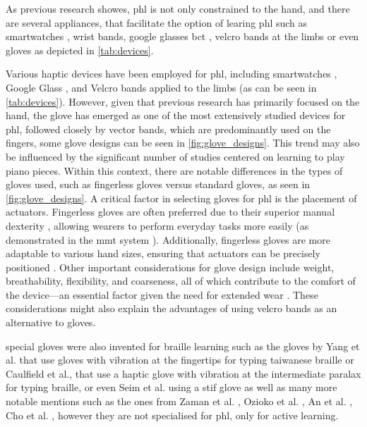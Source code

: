As previous research showes, \gls{phl} is not only constrained to the hand, and there are several appliances, that facilitate the option of learing \gls{phl} such as smartwatches \cite{Seim2018}, wrist bands, google glasses \gls{bct} \cite{Seim2016a}, velcro bands at the limbs \cite{Bouwer2011} or even gloves as depicted in \autoref{tab:devices}.

Various haptic devices have been employed for \gls{phl}, including smartwatches \cite{Seim2018}, Google Glass \cite{Seim2016a}, and Velcro bands applied to the limbs \cite{Bouwer2011} (as can be seen in \autoref{tab:devices}). However, given that previous research has primarily focused on the hand, the glove has emerged as one of the most extensively studied devices for \gls{phl}, followed closely by vector bands, which are predominantly used on the fingers, some glove designs can be seen in \autoref{fig:glove_designs}. This trend may also be influenced by the significant number of studies centered on learning to play piano pieces.
Within this context, there are notable differences in the types of gloves used, such as fingerless gloves versus standard gloves, as seen in \autoref{fig:glove_designs}. A critical factor in selecting gloves for \gls{phl} is the placement of actuators. Fingerless gloves are often preferred due to their superior manual dexterity \cite{Huang2008}, allowing wearers to perform everyday tasks more easily (as demonstrated in the \gls{mmt} system \cite{Markow2010, Kohlsdorf2010, Huang2010}). Additionally, fingerless gloves are more adaptable to various hand sizes, ensuring that actuators can be precisely positioned \cite{Seim2014a, Seim2015b}.
Other important considerations for glove design include weight, breathability, flexibility, and coarseness, all of which contribute to the comfort of the device—an essential factor given the need for extended wear \cite{Markow2010, Kohlsdorf2010, Huang2010, Fang2023a}. These considerations might also explain the advantages of using velcro bands as an alternative to gloves.


special gloves were also invented for braille learning such as the gloves by Yang et al. \cite{Yang2017} that use gloves with vibration at the fingertips for typing taiwanese braille or \cite{Learning2024} Caulfield et al., that use a haptic glove with vibration at the intermediate paralax for typing braille, or even Seim et al. \cite{Seim2014a} using a stif glove \cite{Seim2014} as well as many more notable mentions such as the ones from Zaman et al. \cite{Zaman2019}, Ozioko et al. \cite{Ozioko2017}, An et al. \cite{An2004}, Cho et al. \cite{Cho2002}, however they are not specialised for \gls{phl}, only for active learning.


